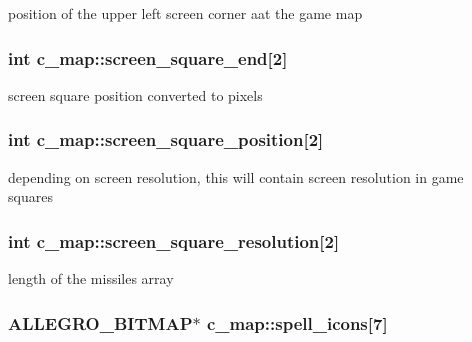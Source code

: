position of the upper left screen corner aat the game map \hypertarget{classc__map_a4fd1b68220337cb514fed398fe79b7ab}{
\subsubsection[{screen\-\_\-square\-\_\-end}]{\setlength{\rightskip}{0pt plus 5cm}int c\-\_\-map\-::screen\-\_\-square\-\_\-end\mbox{[}2\mbox{]}\hspace{0.3cm}{\ttfamily [protected]}}}\label{classc__map_a4fd1b68220337cb514fed398fe79b7ab}
screen square position converted to pixels \hypertarget{classc__map_a2b6fac3ee312a52883ab9ff692dbaf0b}{
\subsubsection[{screen\-\_\-square\-\_\-position}]{\setlength{\rightskip}{0pt plus 5cm}int c\-\_\-map\-::screen\-\_\-square\-\_\-position\mbox{[}2\mbox{]}\hspace{0.3cm}{\ttfamily [protected]}}}\label{classc__map_a2b6fac3ee312a52883ab9ff692dbaf0b}
depending on screen resolution, this will contain screen resolution in game squares \hypertarget{classc__map_af760f25a8a9a58ce904ac0f0b3ee6887}{
\subsubsection[{screen\-\_\-square\-\_\-resolution}]{\setlength{\rightskip}{0pt plus 5cm}int c\-\_\-map\-::screen\-\_\-square\-\_\-resolution\mbox{[}2\mbox{]}\hspace{0.3cm}{\ttfamily [protected]}}}\label{classc__map_af760f25a8a9a58ce904ac0f0b3ee6887}
length of the missiles array \hypertarget{classc__map_afe0fe7415fc6ab78e753dbb95901dee7}{
\subsubsection[{spell\-\_\-icons}]{\setlength{\rightskip}{0pt plus 5cm}A\-L\-L\-E\-G\-R\-O\-\_\-\-B\-I\-T\-M\-A\-P$\ast$ c\-\_\-map\-::spell\-\_\-icons\mbox{[}7\mbox{]}\hspace{0.3cm}{\ttfamily [protected]}}}\label{classc__map_afe0fe7415fc6ab78e753dbb95901dee7}
